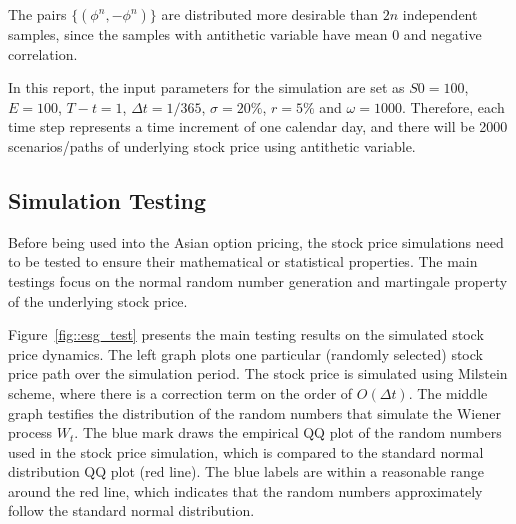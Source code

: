 \documentclass[a4paper,11pt] {article}
\begin{document}
The pairs $\{(\phi^{n},-\phi^{n})\}$ are distributed more desirable than $2n$ independent samples, since the samples with antithetic variable have mean 0 and negative correlation.



In this report, the input parameters for the simulation are set as $S0 = 100$, $E = 100$, $T-t=1$, $\Delta t = 1/365$, $\sigma = 20\%$, $r = 5\%$ and $\omega = 1000$. Therefore, each time step represents a time increment of one calendar day, and there will be 2000 scenarios/paths of underlying stock price using antithetic variable.

\subsection{Simulation Testing}
Before being used into the Asian option pricing, the stock price simulations need to be tested to ensure their mathematical or statistical properties. The main testings focus on the normal random number generation and martingale property of the underlying stock price.

Figure~\ref{fig::esg_test} presents the main testing results on the simulated stock price dynamics. The left graph plots one particular (randomly selected) stock price path over the simulation period. The stock price is simulated using Milstein scheme, where there is a correction term on the order of $O(\Delta t)$. The middle graph testifies the distribution of the random numbers that simulate the Wiener process $W_t$. The blue mark draws the empirical QQ plot of the random numbers used in the stock price simulation, which is compared to the standard normal distribution QQ plot (red line). The blue labels are within a reasonable range around the red line, which indicates that the random numbers approximately follow the standard normal distribution.
\end{document}

